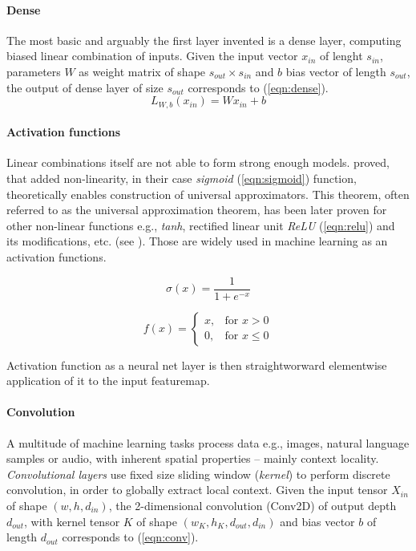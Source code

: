 \paragraph{Dense}
The most basic and arguably the first layer invented is a dense layer, computing biased linear combination of inputs. Given the input vector $x_{in}$ of lenght $s_{in}$, parameters $W$ as weight matrix of shape $s_{out} \times s_{in}$ and $b$ bias vector of length $s_{out}$, the output of dense layer of size $s_{out}$ corresponds to (\ref{eqn:dense}).
\begin{equation} \label{eqn:dense}
L_{W, b}(x_{in}) = W x_{in} + b
\end{equation}

\paragraph{Activation functions}
Linear combinations itself are not able to form strong enough models. \cite{Cybenko1989} proved, that added non-linearity, in their case \emph{sigmoid} (\ref{eqn:sigmoid}) function, theoretically enables construction of universal approximators. This theorem, often referred to as the universal approximation theorem, has been later proven for other non-linear functions e.g., \emph{tanh}, rectified linear unit \emph{ReLU} (\ref{eqn:relu}) and its modifications, etc. (see \cite{DBLP:journals/corr/SonodaM15}). Those are widely used in machine learning as an activation functions.

\begin{equation} \label{eqn:sigmoid}
\sigma(x) = \frac{1}{1 + e^{-x}}
\end{equation}

\begin{equation} \label{eqn:relu}
f(x) =
\begin{cases}
    x, & \text{for } x > 0 \\
    0, & \text{for } x \leq 0
\end{cases}
\end{equation}

Activation function as a neural net layer is then straightworward elementwise application of it to the input featuremap.

\paragraph{Convolution}
A multitude of machine learning tasks process data e.g., images, natural language samples or audio, with inherent spatial properties -- mainly context locality. \emph{Convolutional layers} use fixed size sliding window (\emph{kernel}) to perform discrete convolution, in order to globally extract local context. Given the input tensor $X_{in}$ of shape $(w, h, d_{in})$, the 2-dimensional convolution (Conv2D) of output depth $d_{out}$, with kernel tensor $K$ of shape $(w_K, h_K, d_{out}, d_{in})$ and bias vector $b$ of length $d_{out}$ corresponds to (\ref{eqn:conv}).

